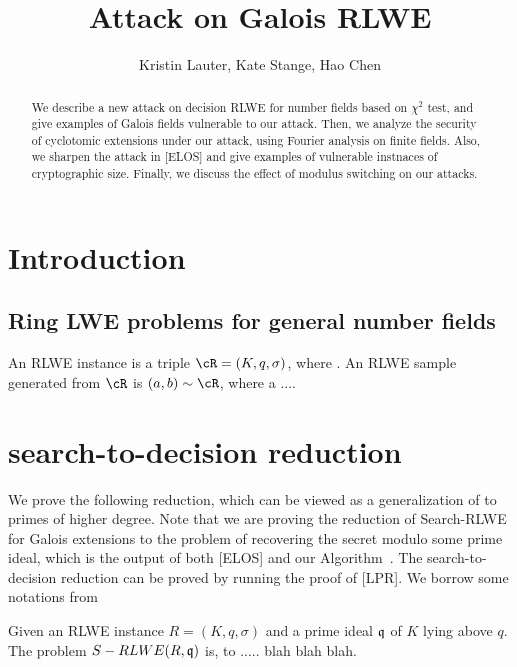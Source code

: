 \documentclass{article}
\title{Attack on Galois RLWE}
\author{Kristin Lauter, Kate Stange, Hao Chen}
\begin{document}
\maketitle

\begin{abstract}
We describe a new attack on decision RLWE for number fields based on $\chi^2$ test, and give examples of Galois fields vulnerable to our attack. Then, we analyze the security of cyclotomic extensions under our attack, using Fourier analysis on finite fields. Also, we sharpen the attack in [ELOS] and give examples of vulnerable instnaces of cryptographic size. Finally, we discuss the effect of modulus switching on our attacks.
\end{abstract}

\section{Introduction}

\subsection{Ring LWE problems for general number fields}


\begin{Definition}
An RLWE instance is a triple $\cR = (K,q,\sigma)$, where .
An RLWE sample generated from $\cR$ is $(a,b) \sim \cR$,
where a ....
\end{Definition}


\section{search-to-decision reduction}

We prove the following reduction, which can be viewed as a generalization of to primes of higher degree. Note that we are proving the reduction of Search-RLWE for Galois extensions to the problem of recovering the secret modulo some prime ideal, which is the output of both [ELOS] and our Algorithm~. The search-to-decision reduction can be proved by running the proof of [LPR]. We borrow some notations from

\begin{Definition}
Given an RLWE instance $R = (K,q,\sigma)$ and a prime ideal $\mathfrak{q}$ of $K$ lying above $q$. The problem $S-RLWE(R, \mathfrak{q})$ is, to ..... blah blah blah.

\end{Definition}
\end{document}
